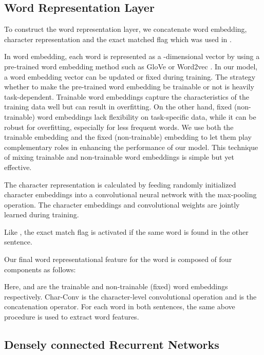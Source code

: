 \documentclass[letterpaper]{article} \usepackage{aaai19}  \usepackage{times}  \usepackage{helvet}  \usepackage{courier}  \usepackage{url}  \usepackage{graphicx}  \frenchspacing  \setlength{\pdfpagewidth}{8.5in}  \setlength{\pdfpageheight}{11in}
\begin{document}
\subsection{Word Representation Layer}

To construct the word representation layer, we concatenate word embedding, character representation and the exact matched flag which was used in \cite{gong2018natural}.

In word embedding, each word is represented as a -dimensional vector by using a pre-trained word embedding method such as GloVe \cite{pennington2014glove} or Word2vec \cite{mikolov2013distributed}. In our model, a word embedding vector can be updated or fixed during training. The strategy whether to make the pre-trained word embedding be trainable or not is heavily task-dependent. Trainable word embeddings capture the characteristics of the training data well but can result in overfitting. On the other hand, fixed (non-trainable) word embeddings lack flexibility on task-specific data, while it can be robust for overfitting, especially for less frequent words. We use both the trainable embedding  and the fixed (non-trainable) embedding  to let them play complementary roles in enhancing the performance of our model. This technique of mixing trainable and non-trainable word embeddings is simple but yet effective. 

The character representation  is calculated by feeding randomly initialized character embeddings into a convolutional neural network with the max-pooling operation. The character embeddings and convolutional weights are jointly learned during training. 

Like \cite{gong2018natural}, the exact match flag  is activated if the
same word is found in the other sentence. 

Our final word representational feature  for the word  is composed of four components as follows:

Here,  and  are the trainable and non-trainable (fixed) word embeddings respectively. Char-Conv is the character-level convolutional operation and  is the concatenation operator. For each word in both sentences, the same above procedure is used to extract word features.


\subsection{Densely connected Recurrent Networks}
\end{document}
